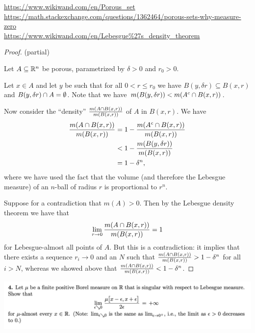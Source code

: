 \url{https://www.wikiwand.com/en/Porous_set}\\
\url{https://math.stackexchange.com/questions/1362464/porous-sets-why-measure-zero}\\
\url{https://www.wikiwand.com/en/Lebesgue\%27s_density_theorem}\\

\begin{proof}
   (partial)

  Let $A \subseteq \mathbb{R}^n$ be porous, parametrized by $\delta > 0$ and $r_0 > 0$.

  Let $x \in A$ and let $y$ be such that for all $0 < r \leq r_0$ we have $B(y, \delta r) \subseteq B(x, r)$
  and $B(y, \delta r) \cap A = \emptyset$. Note that we have $m(B(y, \delta r)) < m(A^c \cap B(x, r))$.

  Now consider the ``density​'' $\frac{m(A \cap B(x, r))}{m(B(x, r))}$ of $A$ in $B(x, r)$. We have
  \begin{align*}
    \frac{m(A \cap B(x, r))}{m(B(x, r))}
    &= 1 - \frac{m(A^c \cap B(x, r))}{m(B(x, r))} \\
    &< 1 - \frac{m(B(y, \delta r))}{m(B(x, r))} \\
    &= 1 - \delta^n,
  \end{align*}
  where we have used the fact that the volume (and therefore the Lebesgue measure) of an $n$-ball of radius $r$
  is proportional to $r^n$.

  Suppose for a contradiction that $m(A) > 0$. Then by the Lebesgue density theorem we have that
  \begin{align*}
    \lim_{r \to 0} \frac{m(A \isect B(x, r))}{m(B(x, r))} = 1
  \end{align*}
  for Lebesgue-almost all points of $A$. But this is a contradiction: it implies that there exists
  a sequence $r_i \to 0$ and an $N$ such
  that $\frac{m(A \cap B(x, r))}{m(B(x, r))} > 1 - \delta^n$ for all $i > N$, whereas we showed
  above that $\frac{m(A \cap B(x, r))}{m(B(x, r))} < 1 - \delta^n$.
\end{proof}



\newpage
\begin{mdframed}
  \includegraphics[width=400pt]{img/analysis--berkeley-202a-final-21a6.png}
\end{mdframed}

